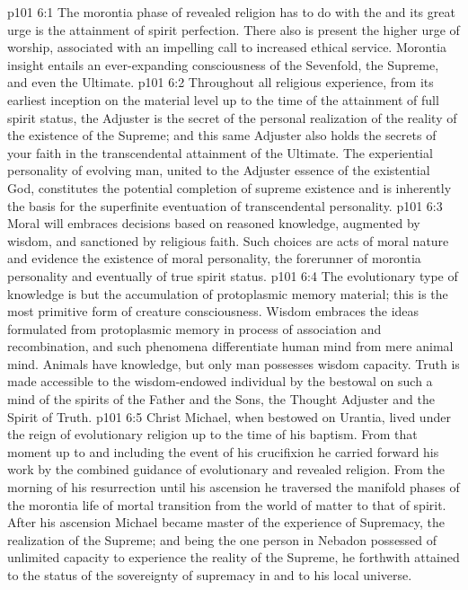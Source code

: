 \vs p101 6:1 The morontia phase of revealed religion has to do with the  and its great urge is the attainment of spirit perfection. There also is present the higher urge of worship, associated with an impelling call to increased ethical service. Morontia insight entails an ever\hyp{}expanding consciousness of the Sevenfold, the Supreme, and even the Ultimate.
\vs p101 6:2 Throughout all religious experience, from its earliest inception on the material level up to the time of the attainment of full spirit status, the Adjuster is the secret of the personal realization of the reality of the existence of the Supreme; and this same Adjuster also holds the secrets of your faith in the transcendental attainment of the Ultimate. The experiential personality of evolving man, united to the Adjuster essence of the existential God, constitutes the potential completion of supreme existence and is inherently the basis for the superfinite eventuation of transcendental personality.
\pc \vs p101 6:3 Moral will embraces decisions based on reasoned knowledge, augmented by wisdom, and sanctioned by religious faith. Such choices are acts of moral nature and evidence the existence of moral personality, the forerunner of morontia personality and eventually of true spirit status.
\vs p101 6:4 The evolutionary type of knowledge is but the accumulation of protoplasmic memory material; this is the most primitive form of creature consciousness. Wisdom embraces the ideas formulated from protoplasmic memory in process of association and recombination, and such phenomena differentiate human mind from mere animal mind. Animals have knowledge, but only man possesses wisdom capacity. Truth is made accessible to the wisdom\hyp{}endowed individual by the bestowal on such a mind of the spirits of the Father and the Sons, the Thought Adjuster and the Spirit of Truth.
\pc \vs p101 6:5 Christ Michael, when bestowed on Urantia, lived under the reign of evolutionary religion up to the time of his baptism. From that moment up to and including the event of his crucifixion he carried forward his work by the combined guidance of evolutionary and revealed religion. From the morning of his resurrection until his ascension he traversed the manifold phases of the morontia life of mortal transition from the world of matter to that of spirit. After his ascension Michael became master of the experience of Supremacy, the realization of the Supreme; and being the one person in Nebadon possessed of unlimited capacity to experience the reality of the Supreme, he forthwith attained to the status of the sovereignty of supremacy in and to his local universe.
